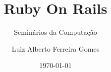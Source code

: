 \author{Luiz Alberto Ferreira Gomes}
\title{Ruby On Rails}
\subtitle{Seminários da Computação}
\date{\today}
